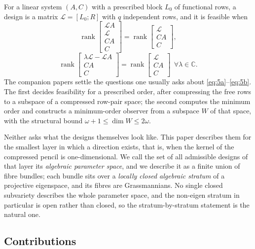 \documentclass[journal]{IEEEtran}
\theoremstyle{plainn}
\theoremstyle{remark}
\newcommand{\rank}{\operatorname{rank}}
\begin{document}
For a linear system $(A,C)$ with a prescribed block $L_0$ of functional rows, a design is a matrix
$\mathcal L=[L_0;R]$ with $q$ independent rows, and it is feasible when
\begin{equation}\label{eq:5a}
\rank\begin{bmatrix}\mathcal LA\\ \mathcal L\\ CA\\ C\end{bmatrix}
=\rank\begin{bmatrix}\mathcal L\\ CA\\ C\end{bmatrix},
\end{equation}
\begin{equation}\label{eq:5b}
\rank\begin{bmatrix}\lambda\mathcal L-\mathcal LA\\ CA\\ C\end{bmatrix}
=\rank\begin{bmatrix}\mathcal L\\ CA\\ C\end{bmatrix}\ \ \forall\lambda\in\mathbb C .
\end{equation}
The companion papers settle the questions one usually asks about \eqref{eq:5a}--\eqref{eq:5b}. The
first \cite{companion1} decides feasibility for a prescribed order, after compressing the free rows to
a subspace of a compressed row-pair space; the second \cite{companion2} computes the minimum order and
constructs a minimum-order observer from a subspace $W$ of that space, with the structural bound
$\omega+1\le\dim W\le 2\omega$.

Neither asks what the designs themselves look like. This paper describes them for the smallest layer
in which a direction exists, that is, when the kernel of the compressed pencil is one-dimensional. We
call the set of all admissible designs of that layer its \emph{algebraic parameter space}, and we
describe it as a finite union of fibre bundles; each bundle sits over a \emph{locally closed algebraic
stratum} of a projective eigenspace, and its fibres are Grassmannians. No single closed subvariety
describes the whole parameter space, and the non-eigen stratum in particular is open rather than
closed, so the stratum-by-stratum statement is the natural one.

\subsection{Contributions}\label{sec:intro:contributions}
\end{document}

